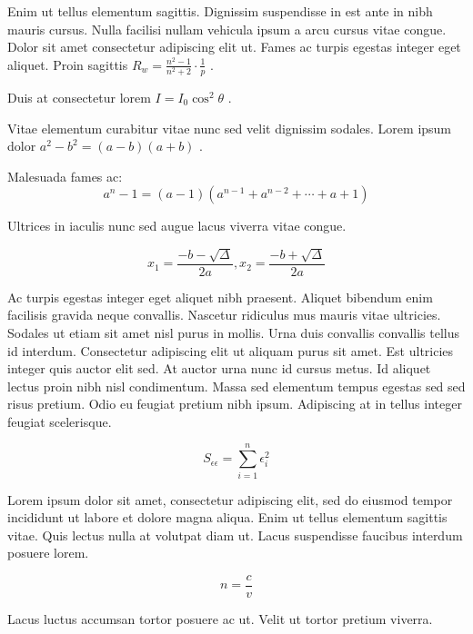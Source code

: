 \documentclass{article}
\begin{document}
Enim ut tellus elementum sagittis. Dignissim suspendisse in est ante in nibh mauris cursus. Nulla facilisi nullam vehicula ipsum a arcu cursus vitae congue. Dolor sit amet consectetur adipiscing elit ut. Fames ac turpis egestas integer eget aliquet. Proin sagittis 
\begin{math}
	R_w=\frac{n^2-1}{n^2+2} \cdot \frac{1}{p}
\end{math}
.\newline

Duis at consectetur lorem
 $ I=I_0\cos ^2\theta $
 .\newline

Vitae elementum curabitur vitae nunc sed velit dignissim sodales. Lorem ipsum dolor 
\( a^2-b^2=(a-b)(a+b) \)
.\newline

Malesuada fames ac: 
\[ a^n-1=(a-1)(a^{n-1}+a^{n-2}+\cdots+a+1) \]

Ultrices in iaculis nunc sed augue lacus viverra vitae congue.

$$ x_1=\frac{-b-\sqrt{\Delta}}{2a},x_2=\frac{-b+\sqrt{\Delta}}{2a} $$

Ac turpis egestas integer eget aliquet nibh praesent. Aliquet bibendum enim facilisis gravida neque convallis. Nascetur ridiculus mus mauris vitae ultricies. Sodales ut etiam sit amet nisl purus in mollis. Urna duis convallis convallis tellus id interdum. Consectetur adipiscing elit ut aliquam purus sit amet. Est ultricies integer quis auctor elit sed. At auctor urna nunc id cursus metus. Id aliquet lectus proin nibh nisl condimentum. Massa sed elementum tempus egestas sed sed risus pretium. Odio eu feugiat pretium nibh ipsum. Adipiscing at in tellus integer feugiat scelerisque.

\begin{displaymath}
	S_{\epsilon \epsilon}=\sum_{i=1}^{n}\epsilon_i^2
\end{displaymath}

Lorem ipsum dolor sit amet, consectetur adipiscing elit, sed do eiusmod tempor incididunt ut labore et dolore magna aliqua. Enim ut tellus elementum sagittis vitae. Quis lectus nulla at volutpat diam ut. Lacus suspendisse faucibus interdum posuere lorem. 

\begin{equation}
	n=\frac{c}{v}
\end{equation}

Lacus luctus accumsan tortor posuere ac ut. Velit ut tortor pretium viverra.
\end{document}
